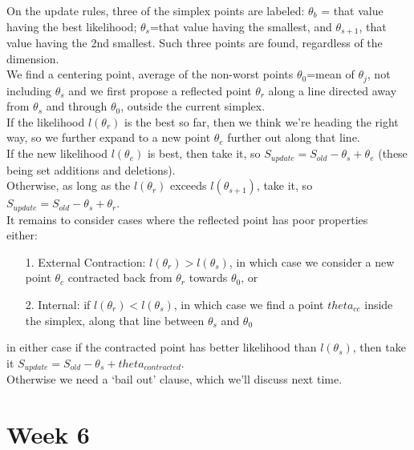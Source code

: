 \documentclass[11pt,a4paper]{article}
\begin{document}
On the update rules, three of the simplex points are labeled:   $\theta_b$ = that value having the best likelihood; $\theta_s$=that value having the smallest, and $\theta_{s+1}$, that value having the 2nd smallest. Such three points are found, regardless of the dimension.\\
We find a centering point, average of the non-worst points $\theta_0$=mean of $\theta_j$, not including $\theta_s$ and we first propose a reflected point $\theta_r$  along a line directed away from $\theta_s$ and through $\theta_0$, outside the current simplex.\\
If the likelihood $l(\theta_r)$ is the best so far, then we think we're heading the right way, so we further expand to a new point $\theta_e$ further out along that line.\\
If the new likelihood $l(\theta_e)$ is best, then take it, so $S_{update} = S_{old} - \theta_s + \theta_e$  (these being set additions and deletions).\\
Otherwise, as long as the $l(\theta_r)$ exceeds $l(\theta_{s+1})$, take it, so $S_{update} = S_{old} - \theta_s + \theta_r$.\\
It remains to consider cases where the reflected point has poor properties\\
either:   
\begin{enumerate}
\item[1.] External Contraction: $ l(\theta_r) > l(\theta_s)$, in which case we consider a new point $\theta_c$ contracted back from $\theta_r$ towards $\theta_0$, or
\item[2.] Internal: if $l(\theta_r) < l(\theta_s)$, in which case we find a point $theta_{cc}$ inside the simplex, along that line between $\theta_s$ and $\theta_0$
\end{enumerate}
in either case if the contracted point has better likelihood than $l(\theta_s)$, then take it  $S_{update} = S_{old} -\theta_s + theta_{contracted}$.\\
Otherwise we need a `bail out' clause, which we'll discuss next time.


\section*{Week 6}
\end{document}
